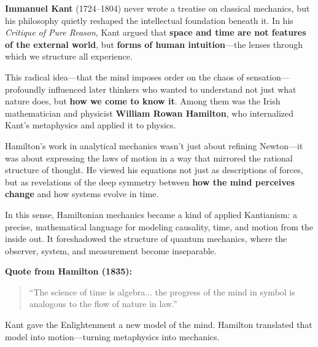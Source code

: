     
    \begin{tcolorbox}[colback=blue!5!white, colframe=blue!50!black, 
      title={Historical Sidebar: Kant’s Philosophy and the Mechanics of Thought}]
      
          \textbf{Immanuel Kant} (1724–1804) never wrote a treatise on classical mechanics, but his philosophy quietly reshaped the intellectual foundation beneath it. In his \textit{Critique of Pure Reason}, Kant argued that \textbf{space and time are not features of the external world}, but \textbf{forms of human intuition}—the lenses through which we structure all experience.
      
          \medskip
      
          This radical idea—that the mind imposes order on the chaos of sensation—profoundly influenced later thinkers who wanted to understand not just what nature does, but \textbf{how we come to know it}. Among them was the Irish mathematician and physicist \textbf{William Rowan Hamilton}, who internalized Kant’s metaphysics and applied it to physics.
      
          \medskip
      
          Hamilton’s work in analytical mechanics wasn’t just about refining Newton—it was about expressing the laws of motion in a way that mirrored the rational structure of thought. He viewed his equations not just as descriptions of forces, but as revelations of the deep symmetry between \textbf{how the mind perceives change} and how systems evolve in time.
      
          \medskip
      
          In this sense, Hamiltonian mechanics became a kind of applied Kantianism: a precise, mathematical language for modeling causality, time, and motion from the inside out. It foreshadowed the structure of quantum mechanics, where the observer, system, and measurement become inseparable.
      
          \medskip
      
          \textbf{Quote from Hamilton (1835):}
          \begin{quote}
          “The science of time is algebra... the progress of the mind in symbol is analogous to the flow of nature in law.”
          \end{quote}
      
          Kant gave the Enlightenment a new model of the mind. Hamilton translated that model into motion—turning metaphysics into mechanics.
          
      \end{tcolorbox}
      
